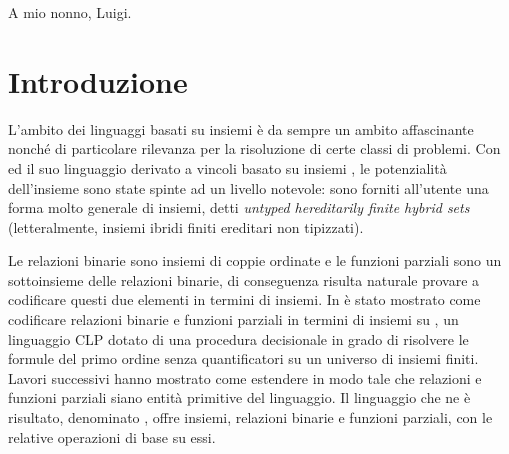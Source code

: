 \documentclass[12pt,a4paper,openright]{book} %
\newenvironment{dedication}                   %
  {%
   \thispagestyle{empty}%
   \vspace*{\stretch{1}}%
   \itshape             %
   \raggedleft          %
  }
  {\par %
   \vspace{\stretch{3}} %
   \clearpage           %
  }
\begin{document}
\thispagestyle{empty}
\cleardoublepage

\begin{dedication}
A mio nonno, Luigi.
\end{dedication}

\thispagestyle{empty}



\tableofcontents




\chapter{Introduzione}
\resetsecnumdepth

\label{ch:intro}

L'ambito dei linguaggi basati su insiemi è da sempre un ambito
affascinante nonché di particolare rilevanza per la risoluzione di
certe classi di problemi. Con \clpset{} ed il suo linguaggio derivato
a vincoli basato su insiemi \lset{}, le potenzialità dell'insieme sono
state spinte ad un livello notevole: sono forniti all'utente una forma
molto generale di insiemi, detti \textit{untyped hereditarily finite
  hybrid sets} (letteralmente, insiemi ibridi finiti ereditari non
tipizzati).

Le relazioni binarie sono insiemi di coppie ordinate e le funzioni
parziali sono un sottoinsieme delle relazioni binarie, di conseguenza
risulta naturale provare a codificare questi due elementi in termini
di insiemi. In \cite{Rossi18} è stato mostrato come codificare
relazioni binarie e funzioni parziali in termini di insiemi su
\clpset{}, un linguaggio CLP dotato di una procedura decisionale in
grado di risolvere le formule del primo ordine senza quantificatori su
un universo di insiemi finiti. Lavori successivi hanno mostrato come
estendere \clpset{} in modo tale che relazioni e funzioni parziali
siano entità primitive del linguaggio. Il linguaggio che ne è
risultato, denominato \lbr{}, offre insiemi, relazioni binarie e
funzioni parziali, con le relative operazioni di base su essi.
\end{document}

